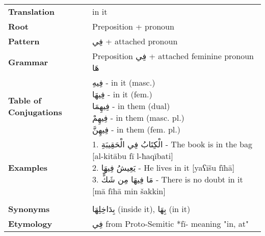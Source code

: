 \documentclass[letterpaper,12pt]{article}
\begin{document}
\begin{tabular}{p{3cm}p{10cm}}
\toprule
\textbf{Translation} & in it \\
\textbf{Root} & Preposition + pronoun \\
\textbf{Pattern} & \textarabic{فِي} + attached pronoun \\
\textbf{Grammar} & Preposition \textarabic{فِي} + attached feminine pronoun \textarabic{هَا} \\
\textbf{Table of Conjugations} & \makecell[l]{
\textarabic{فِيهِ} - in it (masc.)\\
\textarabic{فِيهَا} - in it (fem.)\\
\textarabic{فِيهِمَا} - in them (dual)\\
\textarabic{فِيهِمْ} - in them (masc. pl.)\\
\textarabic{فِيهِنَّ} - in them (fem. pl.)
} \\
\textbf{Examples} & \makecell[l]{\parbox{9.5cm}{
1. \textarabic{الْكِتَابُ فِي الْحَقِيبَةِ} - The book is in the bag [al-kitābu fī l-ħaqībati]\\
2. \textarabic{يَعِيشُ فِيهَا} - He lives in it [yaʕīšu fīhā]\\
3. \textarabic{مَا فِيهَا مِن شَكٍّ} - There is no doubt in it [mā fīhā min šakkin]
}} \\
\midrule \\
\textbf{Synonyms} & \textarabic{بِدَاخِلِهَا} (inside it), \textarabic{بِهَا} (in it) \\
\textbf{Etymology} & \textarabic{فِي} from Proto-Semitic *fī- meaning "in, at" \\
\bottomrule
\end{tabular}

\end{document}

